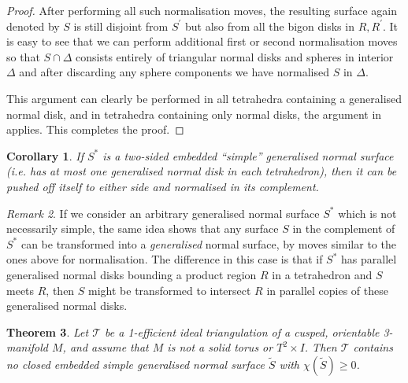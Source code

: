 \documentclass[12pt,reqno]{amsart}  %
\newtheorem{thm}{Theorem}[section]
\newtheorem{cor}[thm]{Corollary}
\theoremstyle{definition}
\theoremstyle{remark}
\newtheorem{rmk}[thm]{Remark}
\def\D{\Delta}
\newcommand{\T}{\mathcal{T}}
\begin{document}
\begin{proof}
After performing all such normalisation moves, the resulting surface 
again denoted by $S$ is still disjoint from $S^\prime$ 
but also from all the bigon disks in  $R, R^\prime$. It is easy to see that 
we can perform additional first or second normalisation 
moves  so that $S \cap  \D$ consists entirely of triangular normal disks 
and spheres in interior $\D$ and after discarding any 
sphere components  we have normalised $S$ in $\D$. 

This argument can clearly be performed in all tetrahedra containing a 
generalised normal disk, and in tetrahedra containing only normal disks, 
the argument in \cite{JR} applies. This completes the proof. 
\end{proof}

\begin{cor}
\label{barrier}
If $S^*$ is a two-sided embedded ``simple'' generalised normal surface 
(i.e. has at most one generalised normal disk in each tetrahedron), then 
it can be pushed off itself to either side and normalised in its complement.
\end{cor}

\begin{rmk}
\label{surface_dies}
If we consider an arbitrary generalised normal surface $S^*$ which is not 
necessarily simple, the same idea shows that any surface $S$ in the 
complement of $S^*$ can be transformed into a {\em generalised} normal 
surface, by moves similar to the ones above for normalisation. 
The difference in this case is that if $S^*$ has parallel generalised 
normal disks bounding a product region $R$ in a tetrahedron and $S$ meets 
$R$,  then $S$ might be transformed to intersect $R$ in 
parallel copies of these generalised normal disks. 
\end{rmk}

\begin{thm}
\label{euler_for_gen_norm_surf}
Let $\T$ be a 1-efficient ideal triangulation of a cusped, orientable 
3-manifold $M$, and assume that $M$ is not a solid torus or $T^2 \times I$.
Then $\T$ contains no closed embedded simple generalised normal surface 
$\tilde S$ with $\chi(\tilde S) \ge 0$.
\end{thm} 
\end{document}
